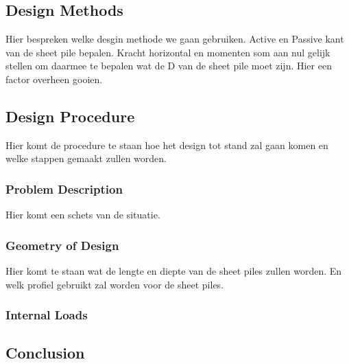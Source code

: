 \subsection{Design Methods}

Hier bespreken welke desgin methode we gaan gebruiken. Active en Passive kant van de sheet pile bepalen. Kracht horizontal en momenten som aan nul gelijk stellen om daarmee te bepalen wat de D van de sheet pile moet zijn. Hier een factor overheen gooien. 

\subsection{Design Procedure}

Hier komt de procedure te staan hoe het design tot stand zal gaan komen en welke stappen gemaakt zullen worden.

\subsubsection{Problem Description}

Hier komt een schets van de situatie.

\subsubsection{Geometry of Design}

Hier komt te staan wat de lengte en diepte van de sheet piles zullen worden. En welk profiel gebruikt zal worden voor de sheet piles.

\subsubsection{Internal Loads}

\subsection{Conclusion}


